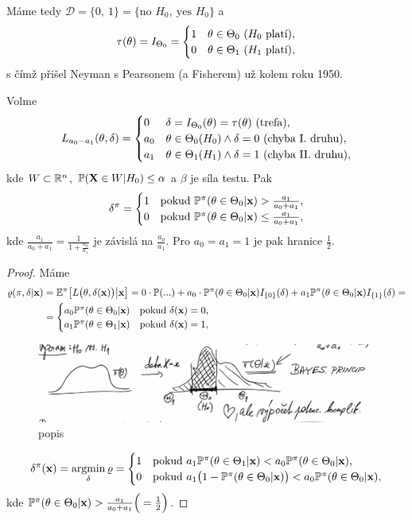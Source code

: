 Máme tedy $\mathscr{D}=\{0,~1\}=\{\text{no }H_0,~\text{yes }H_0\}$ a 
$$ \tau(\theta)=I_{\Theta_0}=\begin{cases}
1& \theta\in\Theta_0~(H_0\text{ platí}),\\0& \theta\in\Theta_1~(H_1\text{ platí}),
\end{cases}$$ s čímž přišel Neyman s Pearsonem (a Fisherem) už kolem roku 1950.
\begin{theorem}
	Volme $$L_{a_0-a_1}(\theta,\delta)=\begin{cases}
	0&\delta=I_{\Theta_0}(\theta)=\tau(\theta)~(\text{trefa}),\\a_0& \theta\in\Theta_0(H_0)\wedge \delta=0~(\text{chyba I. druhu}),\\a_1& \theta\in\Theta_1(H_1)\wedge \delta=1~(\text{chyba II. druhu}),
	\end{cases}$$
	kde $W\subset\mathbb{R}^n$, $\mathbb{P}(\textbf{X}\in W|H_0)\leq \alpha$ a $\beta$ je síla testu. Pak $$\delta^\pi=\begin{cases}
	1& \text{pokud }\mathbb{P}^\pi(\theta\in\Theta_0|\textbf{x})>\frac{a_1}{a_0+a_1},\\
	0& \text{pokud }\mathbb{P}^\pi(\theta\in\Theta_0|\textbf{x})\leq\frac{a_1}{a_0+a_1},
	\end{cases}$$ kde $\frac{a_1}{a_0+a_1}=\frac{1}{1+\frac{a_0}{a_1}}$ je závislá na $\frac{a_0}{a_1}$. Pro $a_0=a_1=1$ je pak hranice $\frac{1}{2}$.
	\begin{proof}
		Máme
		\[
		\begin{split}
		\varrho(\pi,\delta|\textbf{x})&=\mathbb{E}^\pi\big[L\big(\theta,\delta(\textbf{x})\big)\big| \textbf{x}\big]=0\cdot\mathbb{P}(...)+a_0\cdot \mathbb{P}^\pi(\theta\in\Theta_0|\textbf{x})I_{\{0\}}(\delta)+a_1 \mathbb{P}^\pi (\theta\in\Theta_0|\textbf{x})I_{\{1\}}(\delta)=\\&=\begin{cases}
		a_0 \mathbb{P}^\pi(\theta\in\Theta_0|\textbf{x})&\text{pokud }\delta(\textbf{x})=0,\\
		a_1 \mathbb{P}^\pi(\theta\in\Theta_1|\textbf{x})&\text{pokud }\delta(\textbf{x})=1,
		\end{cases}
		\end{split}
		\] 
		
		\begin{figure}[h]
			\centering
			\includegraphics[width=0.7\linewidth]{pictures/last0}
			\caption{popis}
			\label{fig:last0}
		\end{figure}
		
		
		$$ \delta^\pi(\textbf{x})=\mathop{\mathrm{argmin}}_\delta \varrho=\begin{cases}
		1&\text{pokud }a_1\mathbb{P}^\pi(\theta\in\Theta_1|\textbf{x})<a_0\mathbb{P}^\pi(\theta\in\Theta_0|\textbf{x}),\\
		0&\text{pokud }a_1\big(1-\mathbb{P}^\pi(\theta\in\Theta_0|\textbf{x})\big)<a_0\mathbb{P}^\pi(\theta\in\Theta_0|\textbf{x}),\\
		\end{cases} $$
		kde $\mathbb{P}^\pi(\theta\in\Theta_0|\textbf{x})>\frac{a_1}{a_0+a_1}\Big(=\frac{1}{2}\Big)$.
	\end{proof}
\end{theorem}
